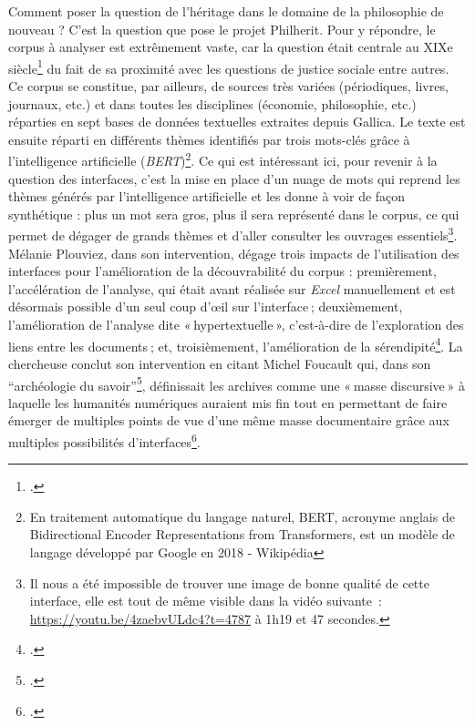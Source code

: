 Comment poser la question de l’héritage dans le domaine de la philosophie de nouveau ? C’est la question que pose le projet Philherit. Pour y répondre, le corpus à analyser est extrêmement vaste, car la question était centrale au XIXe siècle\footcite{plouviez2023} du fait de sa proximité avec les questions de justice sociale entre autres. Ce corpus se constitue, par ailleurs, de sources très variées (périodiques, livres, journaux, etc.) et dans toutes les disciplines (économie, philosophie, etc.) réparties en sept bases de données textuelles extraites depuis Gallica. Le texte est ensuite réparti en différents thèmes identifiés par trois mots-clés grâce à l’intelligence artificielle (\textit{BERT})\footnote{En traitement automatique du langage naturel, BERT, acronyme anglais de Bidirectional Encoder Representations from Transformers, est un modèle de langage développé par Google en 2018 - Wikipédia}. Ce qui est intéressant ici, pour revenir à la question des interfaces, c’est la mise en place d’un nuage de mots qui reprend les thèmes générés par l’intelligence artificielle et les donne à voir de façon synthétique : plus un mot sera gros, plus il sera représenté dans le corpus, ce qui permet de dégager de grands thèmes et d’aller consulter les ouvrages essentiels\footnote{Il nous a été impossible de trouver une image de bonne qualité de cette interface, elle est tout de même visible dans la vidéo suivante : \url{https://youtu.be/4zaebvULdc4?t=4787} à 1h19 et 47 secondes.}. Mélanie Plouviez, dans son intervention, dégage trois impacts de l’utilisation des interfaces pour l’amélioration de la découvrabilité du corpus : premièrement, l’accélération de l’analyse, qui était avant réalisée sur \textit{Excel} manuellement et est désormais possible d’un seul coup d’œil sur l’interface ; deuxièmement, l’amélioration de l’analyse dite « hypertextuelle », c’est-à-dire de l’exploration des liens entre les documents ; et, troisièmement, l’amélioration de la sérendipité\footcite{plouviez2023}. La chercheuse conclut son intervention en citant Michel Foucault qui, dans son \enquote{archéologie du savoir}\footcite{foucault_archeologie_2008}, définissait les archives comme une « masse discursive » à laquelle les humanités numériques auraient mis fin tout en permettant de faire émerger de multiples points de vue d’une même masse documentaire grâce aux multiples possibilités d’interfaces\footcite{plouviez_philosophie_2023}.

